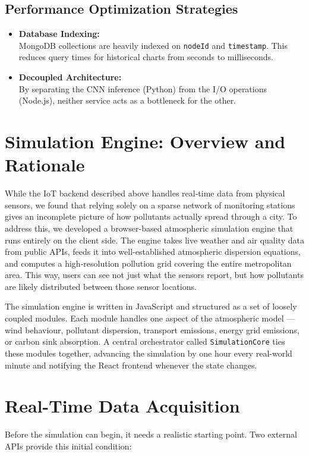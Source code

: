 \documentclass[a4paper, 12pt]{report}
\begin{document}
\subsection{Performance Optimization Strategies}
\begin{itemize}
\item \textbf{Database Indexing:}\\
MongoDB collections are heavily indexed on \texttt{nodeId} and \texttt{timestamp}. This reduces query times for historical charts from seconds to milliseconds.
\item \textbf{Decoupled Architecture:}\\
By separating the CNN inference (Python) from the I/O operations (Node.js), neither service acts as a bottleneck for the other.
\end{itemize}

\section{Simulation Engine: Overview and Rationale}
While the IoT backend described above handles real-time data from physical sensors, we found that relying solely on a sparse network of monitoring stations gives an incomplete picture of how pollutants actually spread through a city. To address this, we developed a browser-based atmospheric simulation engine that runs entirely on the client side. The engine takes live weather and air quality data from public APIs, feeds it into well-established atmospheric dispersion equations, and computes a high-resolution pollution grid covering the entire metropolitan area. This way, users can see not just what the sensors report, but how pollutants are likely distributed between those sensor locations.

The simulation engine is written in JavaScript and structured as a set of loosely coupled modules. Each module handles one aspect of the atmospheric model --- wind behaviour, pollutant dispersion, transport emissions, energy grid emissions, or carbon sink absorption. A central orchestrator called \texttt{SimulationCore} ties these modules together, advancing the simulation by one hour every real-world minute and notifying the React frontend whenever the state changes.

\section{Real-Time Data Acquisition}
Before the simulation can begin, it needs a realistic starting point. Two external APIs provide this initial condition:
\end{document}
